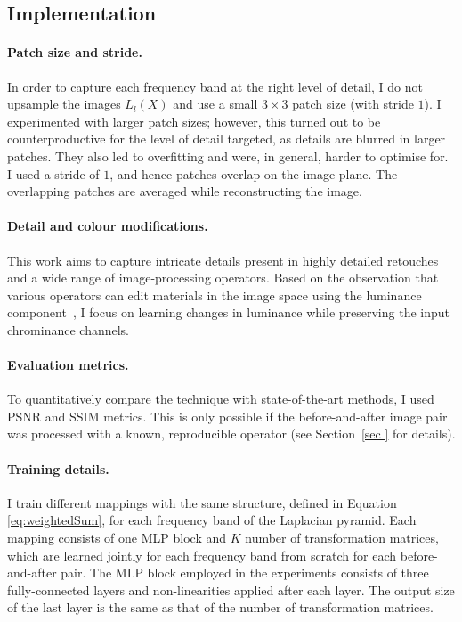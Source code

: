 
\subsection{Implementation}
\label{sec:Implementation}

 \paragraph{Patch size and stride.} In order to capture each frequency band at the right level of detail, I do not upsample the images $L_l(X)$ and use a small $3 \times 3$ patch size (with stride $1$). I experimented with larger patch sizes; however, this turned out to be counterproductive for the level of detail targeted, as details are blurred in larger patches. They also led to overfitting and were, in general, harder to optimise for. I used a stride of $1$, and hence patches overlap on the image plane. The overlapping patches are averaged while reconstructing the image.

\paragraph{Detail and colour modifications.} This work aims to capture intricate details present in highly detailed retouches and a wide range of image-processing operators. Based on the observation that various operators can edit materials in the image space using the luminance component~\cite{Boyadzhiev15Band}, I focus on learning changes in luminance while preserving the input chrominance channels.

\paragraph{Evaluation metrics.} To quantitatively compare the technique with state-of-the-art methods, I used PSNR and SSIM metrics. This is only possible if the before-and-after image pair was processed with a known, reproducible operator (see Section~\ref{sec
} for details).

\paragraph{Training details.}\label{train_det} I train different mappings with the same structure, defined in Equation \ref{eq:weightedSum}, for each frequency band of the Laplacian pyramid. Each mapping consists of one MLP block and $K$ number of transformation matrices, which are learned jointly for each frequency band from scratch for each before-and-after pair. The MLP block employed in the experiments consists of three fully-connected layers and non-linearities applied after each layer. The output size of the last layer is the same as that of the number of transformation matrices.

